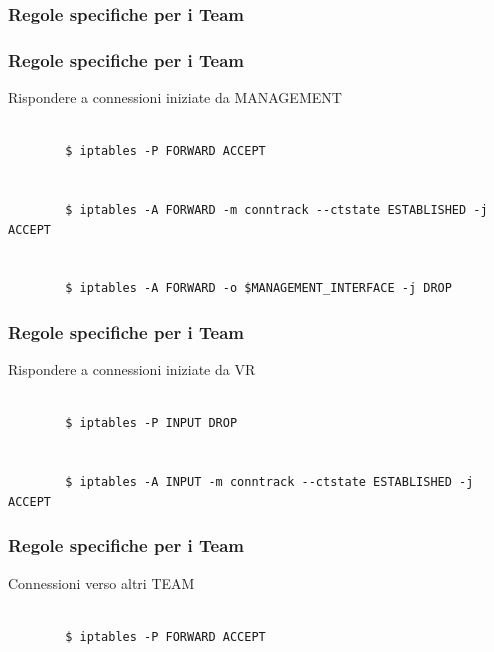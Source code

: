 \documentclass{beamer}
\begin{document}
\subsubsection{Regole specifiche per i Team}
\begin{frame}[fragile]
    \frametitle{Regole specifiche per i Team}
    Rispondere a connessioni iniziate da MANAGEMENT
    \\~\\
    \begin{lstlisting}
        $ iptables -P FORWARD ACCEPT 
        
        
        $ iptables -A FORWARD -m conntrack --ctstate ESTABLISHED -j ACCEPT
        
        
        $ iptables -A FORWARD -o $MANAGEMENT_INTERFACE -j DROP
    \end{lstlisting}

\end{frame}
\begin{frame}[fragile]
    \frametitle{Regole specifiche per i Team}
    Rispondere a connessioni iniziate da VR
    \\~\\
    \begin{lstlisting}
        $ iptables -P INPUT DROP
        
        
        $ iptables -A INPUT -m conntrack --ctstate ESTABLISHED -j ACCEPT
    \end{lstlisting}

\end{frame}

\begin{frame}[fragile]
    \frametitle{Regole specifiche per i Team}
    Connessioni verso altri TEAM
    \\~\\
    \begin{lstlisting}
        $ iptables -P FORWARD ACCEPT
    \end{lstlisting}

\end{frame}
\end{document}
